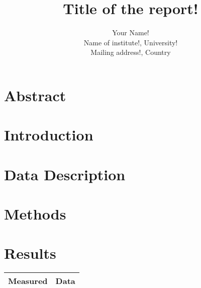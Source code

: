 \documentclass[11pt, A4paper, english]{article}
\author{
Your Name! \\
Name of institute!, University! \\
Mailing address!, Country
}
\title{Title of the report!}
\begin{document}
\maketitle

	\section{Abstract}


	\begin{multicols}{2}
		\section{Introduction}

		\section{Data Description}

		\section{Methods}

	\end{multicols}

		\section{Results}
			\begin{tabular}{|l|r|}
\hline
Measured & Data \\
\hline
\hline
			\end{tabular}
\end{document}
